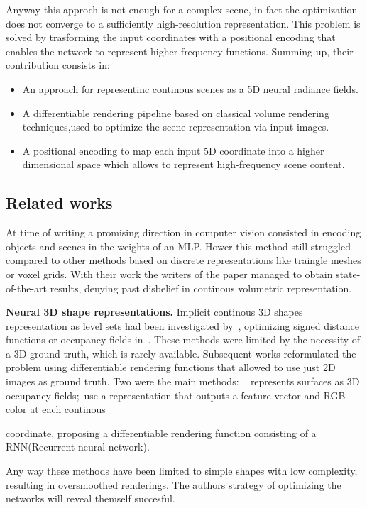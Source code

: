 Anyway this approch is not enough for a complex scene, in fact the optimization 
does not converge to a sufficiently high-resolution representation. This problem
is solved by trasforming the input coordinates with a positional encoding
that enables the network to represent higher frequency functions.
Summing up, their contribution consists in:
\begin{itemize}
    \item An approach for representinc continous scenes as a 5D neural radiance fields.
    \item A differentiable rendering pipeline based on classical volume rendering
    techniques,used to optimize the scene representation via input images.
    \item A positional encoding to map each input 5D coordinate into a higher dimensional
    space which allows to represent high-frequency scene content.
\end{itemize}
\subsection{Related works}
At time of writing a promising direction in computer vision
consisted in encoding objects and scenes in the weights of an MLP. Hower this
method still struggled compared to other methods based on discrete representations
like traingle meshes or voxel grids. With their work the writers of the paper 
managed to obtain state-of-the-art results, denying past disbelief in continous 
volumetric representation.

\textbf{Neural 3D shape representations.} Implicit continous 3D shapes 
representation as level sets had been investigated by~\cite{nerf15,nerf32}, optimizing
signed distance functions or occupancy fields in~\cite{nerf11,nerf27}.
These methods were limited by the necessity of a 3D ground truth, which is 
rarely available. Subsequent works reformulated the problem using differentiable
rendering functions that allowed to use just 2D images as ground truth. Two were the main methods:
~\cite{nerf29} represents surfaces as 3D occupancy fields;~\cite{nerf42}use a 
representation that outputs a feature vector and RGB color at each continous 

coordinate, proposing a differentiable rendering function consisting of a RNN(Recurrent neural network).

Any way these methods have been limited to simple shapes with low complexity,
resulting in oversmoothed renderings. The authors strategy of optimizing 
the networks will reveal themself succesful.

